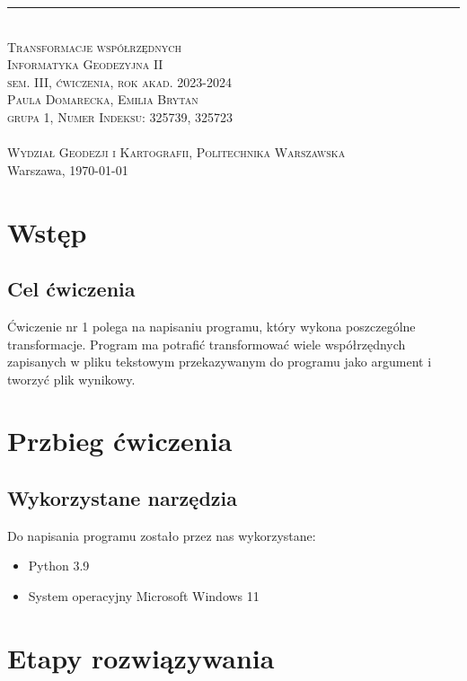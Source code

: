 \documentclass[10pt,a4paper]{article}
\newcommand{\authorName}{Paula Domarecka, Emilia Brytan \\ grupa 1, Numer Indeksu: 325739, 325723}
\newcommand{\titeReport}{Transformacje współrzędnych} %
\newcommand{\titleLecture}{Informatyka Geodezyjna II \\ sem. III, ćwiczenia, rok akad. 2023-2024} %
\newcommand{\faculty}{Wydział Geodezji i Kartografii}
\newcommand{\university}{Politechnika Warszawska}
\newcommand{\city}{Warszawa}
\begin{document}
		\rule{\textwidth}{.5pt} \\
		\vspace{1.0cm}
		\Large \textsc{\titeReport}
		\vspace{0.5cm} \\  
		\large \textsc{\titleLecture}
		\vspace{0.5cm}\\
		\textsc{\authorName}  \\
		\mymail \\
		\textsc{\faculty}, \textsc{\university}  \\ 
		\city, \today
	
	\tableofcontents
	\newpage
\section{Wstęp}
\subsection{Cel ćwiczenia}
Ćwiczenie nr 1 polega na napisaniu programu, który wykona poszczególne transformacje. Program ma potrafić transformować wiele współrzędnych zapisanych w pliku tekstowym przekazywanym do programu jako argument i tworzyć plik wynikowy. 
\section{Przbieg ćwiczenia}
\subsection{Wykorzystane narzędzia}
Do napisania programu zostało przez nas wykorzystane:
\begin{itemize}
	\item Python 3.9
	\item System operacyjny Microsoft Windows 11
\end{itemize}


\section{Etapy rozwiązywania}
\end{document}
